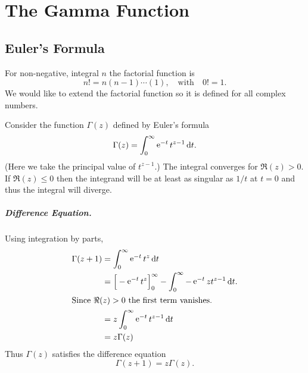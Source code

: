 \flushbottom




\chapter{The Gamma Function}





\section{Euler's Formula}

For non-negative, integral $n$ the factorial function is
\[ n! = n(n-1) \cdots (1), \quad \mathrm{with} \quad 0! = 1. \]
We would like to extend the factorial function so it is defined for all
complex numbers.

Consider the function $\Gamma(z)$ defined by Euler's formula
\[ \Gamma(z) = \int_0^\infty\mathop{\mathrm{e}}\nolimits^{-t} t^{z-1}\,\mathrm{d} t.\]
(Here we take the principal value of $t^{z-1}$.)  The integral converges for
$\Re(z) > 0$.  If $\Re(z) \leq 0$ then the integrand will be at least as 
singular as $1/t$ at $t = 0$ and thus the integral will diverge.

\paragraph{Difference Equation.}
Using integration by parts,
\begin{align*}
  \Gamma(z+1)
  &= \int_0^\infty\mathop{\mathrm{e}}\nolimits^{-t} t^z\,\mathrm{d} t \\
  &= \Big[- \mathop{\mathrm{e}}\nolimits^{-t} t^z \Big]_0^\infty- \int_0^\infty- \mathop{\mathrm{e}}\nolimits^{-t} z t^{z-1}\,\mathrm{d} t. \\
  \intertext{Since $\Re(z) > 0$ the first term vanishes.}
  &= z \int_0^\infty\mathop{\mathrm{e}}\nolimits^{-t} t^{z-1}\,\mathrm{d} t \\
  &= z \Gamma(z)
\end{align*}
Thus $\Gamma(z)$ satisfies the difference equation
\[ \boxed{ \Gamma(z+1) = z \Gamma(z).} \]

